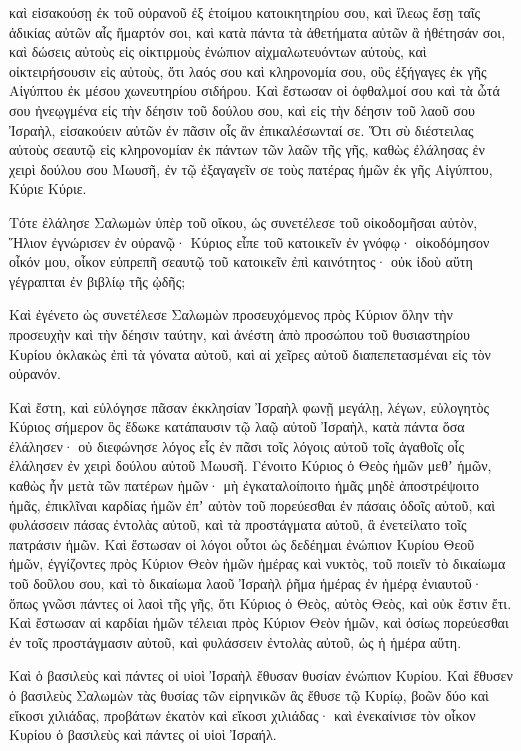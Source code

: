 {καὶ εἰσακούσῃ ἐκ τοῦ οὐρανοῦ ἐξ ἑτοίμου κατοικητηρίου σου,
καὶ ἵλεως ἔσῃ ταῖς ἀδικίας αὐτῶν αἷς ἥμαρτόν σοι, καὶ κατὰ πάντα τὰ ἀθετήματα αὐτῶν ἃ ἠθέτησάν σοι, καὶ δώσεις αὐτοὺς εἰς οἰκτιρμοὺς ἐνώπιον αἰχμαλωτευόντων αὐτοὺς, καὶ οἰκτειρήσουσιν εἰς αὐτοὺς,
ὅτι λαός σου καὶ κληρονομία σου, οὓς ἐξήγαγες ἐκ γῆς Αἰγύπτου ἐκ μέσου χωνευτηρίου σιδήρου.
Καὶ ἔστωσαν οἱ ὀφθαλμοί σου καὶ τὰ ὦτά σου ἠνεῳγμένα εἰς τὴν δέησιν τοῦ δούλου σου, καὶ εἰς τὴν δέησιν τοῦ λαοῦ σου Ἰσραὴλ, εἰσακούειν αὐτῶν ἐν πᾶσιν οἷς ἂν ἐπικαλέσωνταί σε.
Ὅτι σὺ διέστειλας αὐτοὺς σεαυτῷ εἰς κληρονομίαν ἐκ πάντων τῶν λαῶν τῆς γῆς, καθὼς ἐλάλησας ἐν χειρὶ δούλου σου Μωυσῆ, ἐν τῷ ἐξαγαγεῖν σε τοὺς πατέρας ἡμῶν ἐκ γῆς Αἰγύπτου, Κύριε Κύριε.
\par }{\PP {}Τότε ἐλάλησε Σαλωμὼν ὑπὲρ τοῦ οἴκου, ὡς συνετέλεσε τοῦ οἰκοδομῆσαι αὐτὸν, Ἥλιον ἐγνώρισεν ἐν οὐρανῷ· Κύριος εἶπε τοῦ κατοικεῖν ἐν γνόφῳ· οἰκοδόμησον οἶκόν μου, οἶκον εὐπρεπῆ σεαυτῷ τοῦ κατοικεῖν ἐπὶ καινότητος· οὐκ ἰδοὺ αὕτη γέγραπται ἐν βιβλίῳ τῆς ᾠδῆς;
\par }{\PP {}Καὶ ἐγένετο ὡς συνετέλεσε Σαλωμὼν προσευχόμενος πρὸς Κύριον ὅλην τὴν προσευχὴν καὶ τὴν δέησιν ταύτην, καὶ ἀνέστη ἀπὸ προσώπου τοῦ θυσιαστηρίου Κυρίου ὀκλακὼς ἐπὶ τὰ γόνατα αὐτοῦ, καὶ αἱ χεῖρες αὐτοῦ διαπεπετασμέναι εἰς τὸν οὐρανόν.
\par }{\PP {}Καὶ ἔστη, καὶ εὐλόγησε πᾶσαν ἐκκλησίαν Ἰσραὴλ φωνῇ μεγάλῃ, λέγων,
εὐλογητὸς Κύριος σήμερον ὃς ἔδωκε κατάπαυσιν τῷ λαῷ αὐτοῦ Ἰσραὴλ, κατὰ πάντα ὅσα ἐλάλησεν· οὐ διεφώνησε λόγος εἷς ἐν πᾶσι τοῖς λόγοις αὐτοῦ τοῖς ἀγαθοῖς οἷς ἐλάλησεν ἐν χειρὶ δούλου αὐτοῦ Μωυσῆ.
Γένοιτο Κύριος ὁ Θεὸς ἡμῶν μεθʼ ἡμῶν, καθὼς ἦν μετὰ τῶν πατέρων ἡμῶν· μὴ ἐγκαταλοίποιτο ἡμᾶς μηδὲ ἀποστρέψοιτο ἡμᾶς,
ἐπικλῖναι καρδίας ἡμῶν ἐπʼ αὐτὸν τοῦ πορεύεσθαι ἐν πάσαις ὁδοῖς αὐτοῦ, καὶ φυλάσσειν πάσας ἐντολὰς αὐτοῦ, καὶ τὰ προστάγματα αὐτοῦ, ἃ ἐνετείλατο τοῖς πατράσιν ἡμῶν.
Καὶ ἔστωσαν οἱ λόγοι οὗτοι ὡς δεδέημαι ἐνώπιον Κυρίου Θεοῦ ἡμῶν, ἐγγίζοντες πρὸς Κύριον Θεὸν ἡμῶν ἡμέρας καὶ νυκτὸς, τοῦ ποιεῖν τὸ δικαίωμα τοῦ δοῦλου σου, καὶ τὸ δικαίωμα λαοῦ Ἰσραὴλ ῥῆμα ἡμέρας ἐν ἡμέρᾳ ἐνιαυτοῦ·
ὅπως γνῶσι πάντες οἱ λαοὶ τῆς γῆς, ὅτι Κύριος ὁ Θεὸς, αὐτὸς Θεὸς, καὶ οὐκ ἔστιν ἔτι.
Καὶ ἔστωσαν αἱ καρδίαι ἡμῶν τέλειαι πρὸς Κύριον Θεὸν ἡμῶν, καὶ ὁσίως πορεύεσθαι ἐν τοῖς προστάγμασιν αὐτοῦ, καὶ φυλάσσειν ἐντολὰς αὐτοῦ, ὡς ἡ ἡμέρα αὕτη.
\par }{\PP {}Καὶ ὁ βασιλεὺς καὶ πάντες οἱ υἱοὶ Ἰσραὴλ ἔθυσαν θυσίαν ἐνώπιον Κυρίου.
Καὶ ἔθυσεν ὁ βασιλεὺς Σαλωμὼν τὰς θυσίας τῶν εἰρηνικῶν ἃς ἔθυσε τῷ Κυρίῳ, βοῶν δύο καὶ εἴκοσι χιλιάδας, προβάτων ἑκατὸν καὶ εἴκοσι χιλιάδας· καὶ ἐνεκαίνισε τὸν οἶκον Κυρίου ὁ βασιλεὺς καὶ πάντες οἱ υἱοὶ Ἰσραήλ.
}
